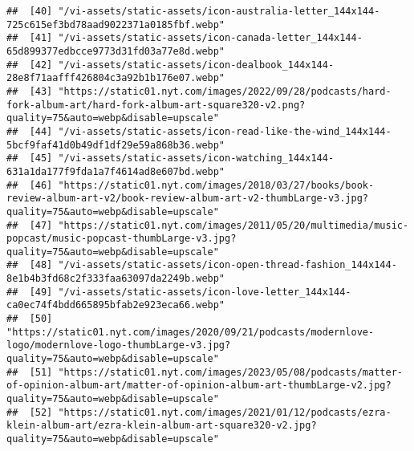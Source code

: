 \documentclass[
]{article}
\begin{document}
\begin{verbatim}
##  [40] "/vi-assets/static-assets/icon-australia-letter_144x144-725c615ef3bd78aad9022371a0185fbf.webp"                                                                                                        
##  [41] "/vi-assets/static-assets/icon-canada-letter_144x144-65d899377edbcce9773d31fd03a77e8d.webp"                                                                                                           
##  [42] "/vi-assets/static-assets/icon-dealbook_144x144-28e8f71aafff426804c3a92b1b176e07.webp"                                                                                                                
##  [43] "https://static01.nyt.com/images/2022/09/28/podcasts/hard-fork-album-art/hard-fork-album-art-square320-v2.png?quality=75&auto=webp&disable=upscale"                                                   
##  [44] "/vi-assets/static-assets/icon-read-like-the-wind_144x144-5bcf9faf41d0b49df1df29e59a868b36.webp"                                                                                                      
##  [45] "/vi-assets/static-assets/icon-watching_144x144-631a1da177f9fda1a7f4614ad8e607bd.webp"                                                                                                                
##  [46] "https://static01.nyt.com/images/2018/03/27/books/book-review-album-art-v2/book-review-album-art-v2-thumbLarge-v3.jpg?quality=75&auto=webp&disable=upscale"                                           
##  [47] "https://static01.nyt.com/images/2011/05/20/multimedia/music-popcast/music-popcast-thumbLarge-v3.jpg?quality=75&auto=webp&disable=upscale"                                                            
##  [48] "/vi-assets/static-assets/icon-open-thread-fashion_144x144-8e1b4b3fd68c2f333faa63097da2249b.webp"                                                                                                     
##  [49] "/vi-assets/static-assets/icon-love-letter_144x144-ca0ec74f4bdd665895bfab2e923eca66.webp"                                                                                                             
##  [50] "https://static01.nyt.com/images/2020/09/21/podcasts/modernlove-logo/modernlove-logo-thumbLarge-v3.jpg?quality=75&auto=webp&disable=upscale"                                                          
##  [51] "https://static01.nyt.com/images/2023/05/08/podcasts/matter-of-opinion-album-art/matter-of-opinion-album-art-thumbLarge-v2.jpg?quality=75&auto=webp&disable=upscale"                                  
##  [52] "https://static01.nyt.com/images/2021/01/12/podcasts/ezra-klein-album-art/ezra-klein-album-art-square320-v2.jpg?quality=75&auto=webp&disable=upscale"                                                 

\end{verbatim}
\end{document}

